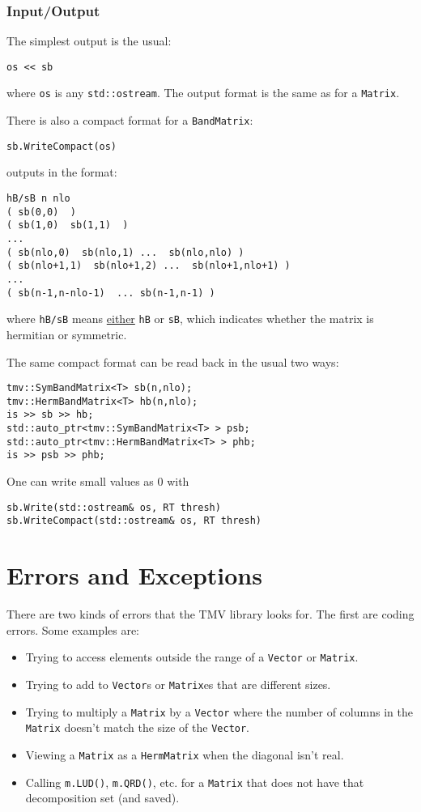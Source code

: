 \documentclass[twoside,letterpaper,11pt]{article}
\renewcommand{\tt}[1]{{\texttt {#1}}}
\begin{document}
\subsubsection{Input/Output}

The simplest output is the usual:
\begin{verbatim}
os << sb
\end{verbatim}
where \tt{os} is any \tt{std::ostream}.
The output format is the same as for a \tt{Matrix}.

There is also a compact format for a \tt{BandMatrix}:
\begin{verbatim}
sb.WriteCompact(os)
\end{verbatim}
outputs in the format:
\begin{verbatim}
hB/sB n nlo
( sb(0,0)  )
( sb(1,0)  sb(1,1)  )
...
( sb(nlo,0)  sb(nlo,1) ...  sb(nlo,nlo) )
( sb(nlo+1,1)  sb(nlo+1,2) ...  sb(nlo+1,nlo+1) )
...
( sb(n-1,n-nlo-1)  ... sb(n-1,n-1) )
\end{verbatim}
where \tt{hB/sB} means \underline{either} \tt{hB} or \tt{sB}, 
which indicates whether the matrix is hermitian or symmetric.

The same compact format can be read back in the usual two ways:
\begin{verbatim}
tmv::SymBandMatrix<T> sb(n,nlo);
tmv::HermBandMatrix<T> hb(n,nlo);
is >> sb >> hb;
std::auto_ptr<tmv::SymBandMatrix<T> > psb;
std::auto_ptr<tmv::HermBandMatrix<T> > phb;
is >> psb >> phb;
\end{verbatim}

One can write small values as 0 with
\begin{verbatim}
sb.Write(std::ostream& os, RT thresh)
sb.WriteCompact(std::ostream& os, RT thresh)
\end{verbatim}

\newpage
\section{Errors and Exceptions}
\label{error}

There are two kinds of errors that the TMV library looks for.  The first are 
coding errors.  Some examples are:
\begin{itemize}
\item
Trying to access elements outside the range of a \tt{Vector} or \tt{Matrix}.
\item
Trying to add to \tt{Vector}s or \tt{Matrix}es that are different sizes.
\item
Trying to multiply a \tt{Matrix} by a \tt{Vector} where the number of columns 
in the \tt{Matrix} doesn't match the size of the \tt{Vector}.
\item
Viewing a \tt{Matrix} as a \tt{HermMatrix} when the diagonal isn't real.
\item
Calling \tt{m.LUD()}, \tt{m.QRD()}, etc. for a \tt{Matrix} that does not have that 
decomposition set (and saved).
\end{itemize}
\end{document}
